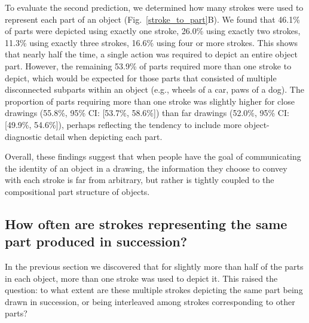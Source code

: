 \documentclass[10pt,letterpaper]{article}
\newcommand{\jefan}[1]{{\color{blue}{[jefan: #1]}}}
\begin{document}
To evaluate the second prediction, we determined how many strokes were used to represent each part of an object (Fig.~\ref{stroke_to_part}B). 
We found that 46.1\% of parts were depicted using exactly one stroke, 26.0\% using exactly two strokes, 11.3\% using exactly three strokes, 16.6\% using four or more strokes. 
This shows that nearly half the time, a single action was required to depict an entire object part. 
However, the remaining 53.9\% of parts required more than one stroke to depict, which would be expected for those parts that consisted of multiple disconnected subparts within an object (e.g., wheels of a car, paws of a dog).
The proportion of parts requiring more than one stroke was slightly higher for close drawings (55.8\%, 95\% CI: [53.7\%, 58.6\%]) than far drawings (52.0\%, 95\% CI: [49.9\%, 54.6\%]), perhaps reflecting the tendency to include more object-diagnostic detail when depicting each part. 

Overall, these findings suggest that when people have the goal of communicating the identity of an object in a drawing, the information they choose to convey with each stroke is far from arbitrary, but rather is tightly coupled to the compositional part structure of objects. 

\subsection{How often are strokes representing the same part produced in succession?}

In the previous section we discovered that for slightly more than half of the parts in each object, more than one stroke was used to depict it. 
This raised the question: to what extent are these multiple strokes depicting the same part being drawn in succession, or being interleaved among strokes corresponding to other parts?
\end{document}
